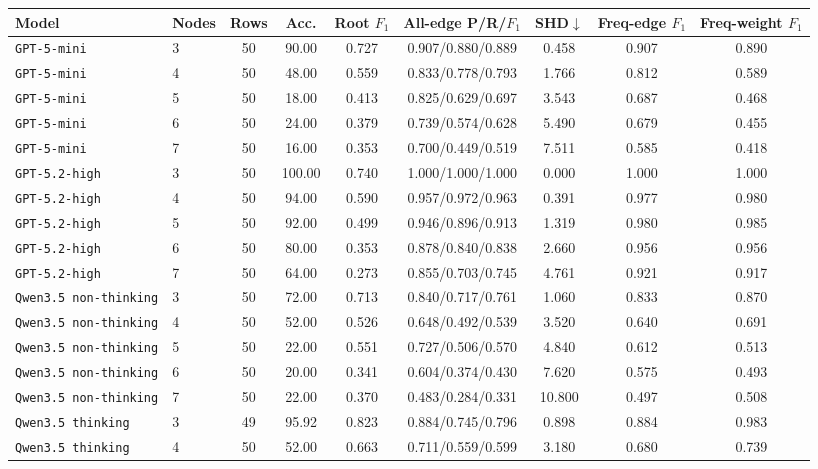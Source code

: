 \begin{table}[!ht]
\centering
\small
\setlength{\tabcolsep}{4pt}
\begin{tabular}{llccccccc}
\toprule
Model & Nodes & Rows & Acc. & Root \(F_1\) & All-edge P/R/\(F_1\) & SHD\(\downarrow\) & Freq-edge \(F_1\) & Freq-weight \(F_1\) \\
\midrule
\texttt{GPT-5-mini} & 3 & 50 & 90.00 & 0.727 & 0.907/0.880/0.889 & 0.458 & 0.907 & 0.890 \\
\texttt{GPT-5-mini} & 4 & 50 & 48.00 & 0.559 & 0.833/0.778/0.793 & 1.766 & 0.812 & 0.589 \\
\texttt{GPT-5-mini} & 5 & 50 & 18.00 & 0.413 & 0.825/0.629/0.697 & 3.543 & 0.687 & 0.468 \\
\texttt{GPT-5-mini} & 6 & 50 & 24.00 & 0.379 & 0.739/0.574/0.628 & 5.490 & 0.679 & 0.455 \\
\texttt{GPT-5-mini} & 7 & 50 & 16.00 & 0.353 & 0.700/0.449/0.519 & 7.511 & 0.585 & 0.418 \\
\midrule
\texttt{GPT-5.2-high} & 3 & 50 & 100.00 & 0.740 & 1.000/1.000/1.000 & 0.000 & 1.000 & 1.000 \\
\texttt{GPT-5.2-high} & 4 & 50 & 94.00 & 0.590 & 0.957/0.972/0.963 & 0.391 & 0.977 & 0.980 \\
\texttt{GPT-5.2-high} & 5 & 50 & 92.00 & 0.499 & 0.946/0.896/0.913 & 1.319 & 0.980 & 0.985 \\
\texttt{GPT-5.2-high} & 6 & 50 & 80.00 & 0.353 & 0.878/0.840/0.838 & 2.660 & 0.956 & 0.956 \\
\texttt{GPT-5.2-high} & 7 & 50 & 64.00 & 0.273 & 0.855/0.703/0.745 & 4.761 & 0.921 & 0.917 \\
\midrule
\texttt{Qwen3.5 non-thinking} & 3 & 50 & 72.00 & 0.713 & 0.840/0.717/0.761 & 1.060 & 0.833 & 0.870 \\
\texttt{Qwen3.5 non-thinking} & 4 & 50 & 52.00 & 0.526 & 0.648/0.492/0.539 & 3.520 & 0.640 & 0.691 \\
\texttt{Qwen3.5 non-thinking} & 5 & 50 & 22.00 & 0.551 & 0.727/0.506/0.570 & 4.840 & 0.612 & 0.513 \\
\texttt{Qwen3.5 non-thinking} & 6 & 50 & 20.00 & 0.341 & 0.604/0.374/0.430 & 7.620 & 0.575 & 0.493 \\
\texttt{Qwen3.5 non-thinking} & 7 & 50 & 22.00 & 0.370 & 0.483/0.284/0.331 & 10.800 & 0.497 & 0.508 \\
\midrule
\texttt{Qwen3.5 thinking} & 3 & 49 & 95.92 & 0.823 & 0.884/0.745/0.796 & 0.898 & 0.884 & 0.983 \\
\texttt{Qwen3.5 thinking} & 4 & 50 & 52.00 & 0.663 & 0.711/0.559/0.599 & 3.180 & 0.680 & 0.739 \\

\end{tabular}
\end{table}
